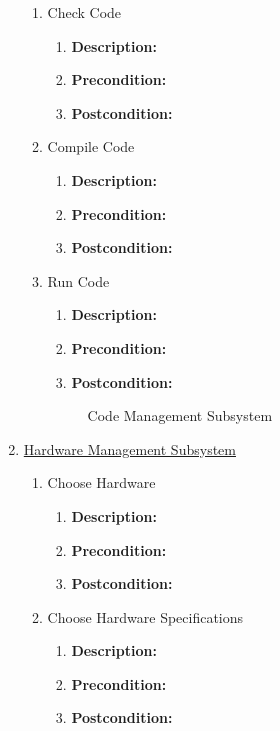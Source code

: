 \documentclass{article}
\begin{document}
\begin{enumerate}
\begin{enumerate}
        \item Check Code
		\begin{enumerate}
			\item \textbf{Description:} 
			\item \textbf{Precondition:}
			\item \textbf{Postcondition:}\newline
		\end{enumerate}
        
        \item Compile Code
		\begin{enumerate}
			\item \textbf{Description:} 
			\item \textbf{Precondition:}
			\item \textbf{Postcondition:}\newline
		\end{enumerate}
        
        \item Run Code
		\begin{enumerate}
			\item \textbf{Description:} 
			\item \textbf{Precondition:}
			\item \textbf{Postcondition:}\newline
		\end{enumerate}
        
        \begin{figure}[h!]
		\caption{Code Management Subsystem}	
	\end{figure}
   \end{enumerate}
        
	\item \underline{Hardware Management Subsystem}
    \begin{enumerate}
		\item Choose Hardware
        
		\begin{enumerate}
			\item \textbf{Description:} 
			\item \textbf{Precondition:}
			\item \textbf{Postcondition:}\newline
		\end{enumerate}
        
        \item Choose Hardware Specifications 
		\begin{enumerate}
			\item \textbf{Description:} 
			\item \textbf{Precondition:}
			\item \textbf{Postcondition:}\newline
		\end{enumerate}
        

\end{enumerate}
\end{enumerate}
\end{document}
